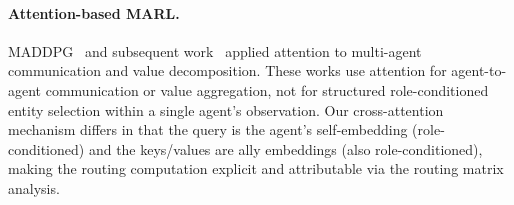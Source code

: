 \paragraph{Attention-based MARL.}
MADDPG~\cite{maddpg} and subsequent work~\cite{maattn} applied attention to multi-agent communication and value decomposition. These works use attention for agent-to-agent communication or value aggregation, not for structured role-conditioned entity selection within a single agent's observation. Our cross-attention mechanism differs in that the query is the agent's self-embedding (role-conditioned) and the keys/values are ally embeddings (also role-conditioned), making the routing computation explicit and attributable via the routing matrix analysis.
